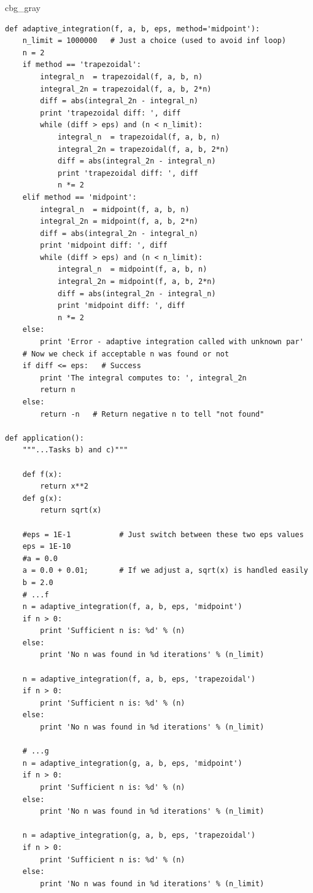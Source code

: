 \documentclass[%
oneside,                 %
final,                   %
10pt,french]{article}
\newenvironment{_cod_tight}[1]{
   \def\FrameCommand{\colorbox{#1}}
   \FrameRule0.6pt\MakeFramed {\FrameRestore}\vskip3mm}
   {\vskip0mm\endMakeFramed}
\newenvironment{cod}[1]{
\bgroup\rmfamily
\fboxsep=0mm\relax
\begin{_cod_tight}{#1}
\list{}{\parsep=-2mm\parskip=0mm\topsep=0pt\leftmargin=2mm
\rightmargin=2\leftmargin\leftmargin=4pt\relax}
\item\relax}
{\endlist\end{_cod_tight}\egroup}
\newenvironment{doconceexercise}{}{}
\begin{document}
\begin{doconceexercise}
\begin{cod}{cbg_gray}
\begin{verbatim}
def adaptive_integration(f, a, b, eps, method='midpoint'):
    n_limit = 1000000   # Just a choice (used to avoid inf loop)
    n = 2
    if method == 'trapezoidal':
        integral_n  = trapezoidal(f, a, b, n)
        integral_2n = trapezoidal(f, a, b, 2*n)
        diff = abs(integral_2n - integral_n)
        print 'trapezoidal diff: ', diff
        while (diff > eps) and (n < n_limit):
            integral_n  = trapezoidal(f, a, b, n)
            integral_2n = trapezoidal(f, a, b, 2*n)
            diff = abs(integral_2n - integral_n)
            print 'trapezoidal diff: ', diff
            n *= 2
    elif method == 'midpoint':
        integral_n  = midpoint(f, a, b, n)
        integral_2n = midpoint(f, a, b, 2*n)
        diff = abs(integral_2n - integral_n)
        print 'midpoint diff: ', diff
        while (diff > eps) and (n < n_limit):
            integral_n  = midpoint(f, a, b, n)
            integral_2n = midpoint(f, a, b, 2*n)
            diff = abs(integral_2n - integral_n)
            print 'midpoint diff: ', diff
            n *= 2
    else:
        print 'Error - adaptive integration called with unknown par'
    # Now we check if acceptable n was found or not
    if diff <= eps:   # Success
        print 'The integral computes to: ', integral_2n
        return n
    else:
        return -n   # Return negative n to tell "not found"

def application():
    """...Tasks b) and c)"""

    def f(x):
        return x**2
    def g(x):
        return sqrt(x)

    #eps = 1E-1           # Just switch between these two eps values
    eps = 1E-10
    #a = 0.0
    a = 0.0 + 0.01;       # If we adjust a, sqrt(x) is handled easily
    b = 2.0
    # ...f
    n = adaptive_integration(f, a, b, eps, 'midpoint')
    if n > 0:
        print 'Sufficient n is: %d' % (n)
    else:
        print 'No n was found in %d iterations' % (n_limit)

    n = adaptive_integration(f, a, b, eps, 'trapezoidal')
    if n > 0:
        print 'Sufficient n is: %d' % (n)
    else:
        print 'No n was found in %d iterations' % (n_limit)

    # ...g
    n = adaptive_integration(g, a, b, eps, 'midpoint')
    if n > 0:
        print 'Sufficient n is: %d' % (n)
    else:
        print 'No n was found in %d iterations' % (n_limit)

    n = adaptive_integration(g, a, b, eps, 'trapezoidal')
    if n > 0:
        print 'Sufficient n is: %d' % (n)
    else:
        print 'No n was found in %d iterations' % (n_limit)


\end{verbatim}
\end{cod}
\end{doconceexercise}
\end{document}
